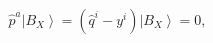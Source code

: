 \begin{equation}
\widehat{p}^{a}\left| B_{X}\right\rangle \!=
\left( \widehat{q}^{i}-y^{i}\right) \left| B_{X}\right\rangle \!=0,
\label{ec2}
\end{equation}

